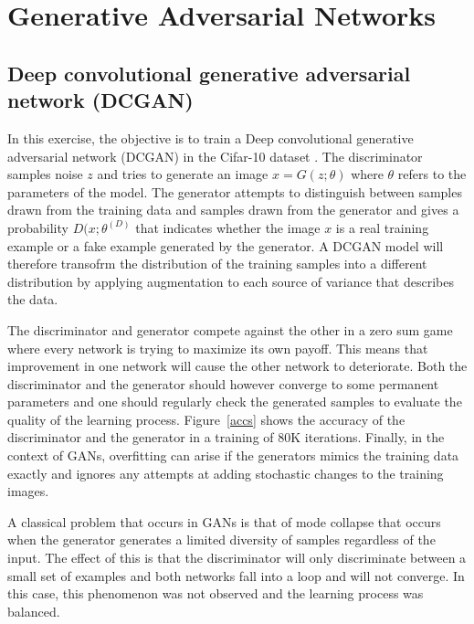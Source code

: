 \documentclass[conference,compsoc]{IEEEtran}
\begin{document}
\section{Generative Adversarial Networks}

\subsection{Deep convolutional generative adversarial network (DCGAN)}




In this exercise, the objective is to train a Deep convolutional generative adversarial network (DCGAN) in the Cifar-10 dataset \cite{cifar}. The discriminator samples noise $z$ and tries to generate an image $x=G(z;\theta)$ where $\theta$ refers to the parameters of the model. The generator attempts to distinguish between samples drawn from the training data and samples drawn from the generator and gives a probability $D(x;\theta^{(D)}$ that indicates whether the image $x$ is a real training example or a fake example generated by the generator.  A DCGAN model will therefore transofrm the distribution of the training samples into a different distribution by applying augmentation to each source of variance that describes the data. 

The discriminator and generator compete against the other in a zero sum game where every network is trying to maximize its own payoff. This means that improvement in one network will cause the other network to deteriorate. Both the discriminator and the generator should however converge to some permanent parameters and one should regularly check the generated samples to evaluate the quality of the learning process. Figure~\ref{accs} shows the accuracy of the discriminator and the generator in a training of 80K iterations. Finally, in the context of GANs, overfitting can arise if the  generators mimics the training data exactly and ignores any attempts at adding stochastic changes to the training images. 


A classical problem that occurs in GANs is that of mode collapse that 
occurs when the generator generates a limited diversity of samples regardless of the input. The effect of this is that the discriminator will only discriminate between a small set of examples and both networks fall into a loop and will not converge. In this case, this phenomenon was not observed and the learning process was balanced.
\end{document}
